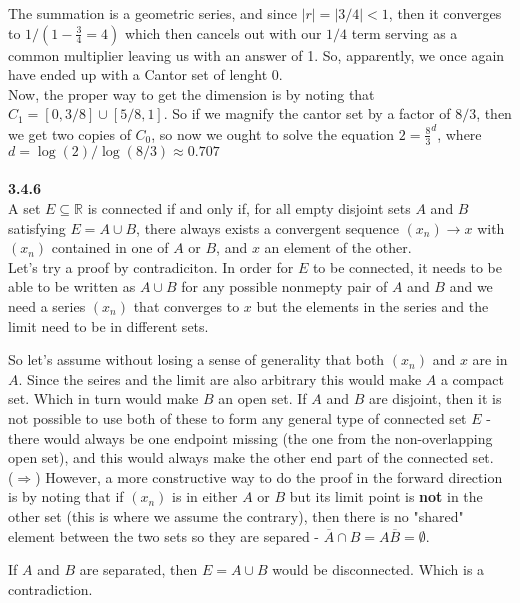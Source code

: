 The summation is a geometric series, and since $|r| = |3/4| < 1$, then it converges to $1 / (1 - \frac{3}{4} = 4)$
which then cancels out with our $1/4$ term serving as a common multiplier leaving us with an answer of 1.
So, apparently, we once again have ended up with a Cantor set of lenght 0.
\\

Now, the proper way to get the dimension is by noting that $C_1 = [0, 3/8] \cup [5/8, 1]$.
So if we magnify the cantor set by a factor of $8/3$, then we get two copies of $C_0$, so now we ought
to solve the equation $2 = \frac{8}{3}^d$, where $d = \log(2)/\log(8/3) \approx 0.707$
\\~\\

\textbf{3.4.6}
\\

A set $E \subseteq \mathbb{R}$ is connected if and only if,
for all empty disjoint sets $A$ and $B$ satisfying $E = A \cup B$,
there always exists a convergent sequence $(x_n) \rightarrow x$
with $(x_n)$ contained in one of $A$ or $B$, and $x$ an element of the other.
\\

Let's try a proof by contradiciton.
In order for $E$ to be connected, it needs to be able to be written as $A \cup B$ for any possible nonmepty pair of $A$ and $B$
and we need a series $(x_n)$ that converges to $x$ but the elements in the series and the limit need to be in different sets.

So let's assume without losing a sense of generality that both $(x_n)$ and $x$ are in $A$.
Since the seires and the limit are also arbitrary this would make $A$ a compact set.
Which in turn would make $B$ an open set.
If $A$ and $B$ are disjoint, then it is not possible to use both of these to form any general type of
connected set $E$ - there would always be one endpoint missing (the one from the non-overlapping open set),
and this would always make the other end part of the connected set.
\\

($\Rightarrow$) However, a more constructive way to do the proof in the forward direction is by noting that if
$(x_n)$ is in either $A$ or $B$ but its limit point is \textbf{not} in the other set (this is where we assume the contrary),
then there is no "shared"
element between the two sets so they are separed - $\overline{A} \cap B = A \overline{B} = \emptyset$.

If $A$ and $B$ are separated, then $E = A \cup B$ would be disconnected.
Which is a contradiction.
\\

